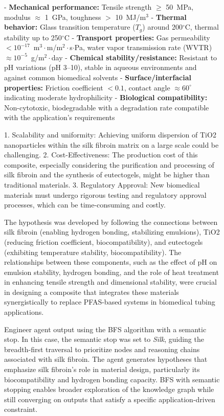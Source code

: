 \begin{figure}[htbp]
\begin{mdframed}
    \textbf{}
    
    - \textbf{Mechanical performance:} Tensile strength $\geq$ 50~MPa, modulus $\approx$ 1~GPa, toughness $>$ 10~MJ/m$^3$
    - \textbf{Thermal behavior:} Glass transition temperature ($T_g$) around 200$^\circ$C, thermal stability up to 250$^\circ$C
    - \textbf{Transport properties:} Gas permeability $< 10^{-17}$~m$^3\cdot$m/m$^2\cdot$s$\cdot$Pa, water vapor transmission rate (WVTR) $\approx 10^{-5}$~g/m$^2\cdot$day
    - \textbf{Chemical stability/resistance:} Resistant to pH variations (pH 3--10), stable in aqueous environments and against common biomedical solvents
    - \textbf{Surface/interfacial properties:} Friction coefficient $< 0.1$, contact angle $\approx 60^\circ$ indicating moderate hydrophilicity
    - \textbf{Biological compatibility:} Non-cytotoxic, biodegradable with a degradation rate compatible with the application's requirements
    
    \textbf{}
    
    1. Scalability and uniformity: Achieving uniform dispersion of TiO2 nanoparticles within the silk fibroin matrix on a large scale could be challenging. 
    2. Cost-Effectiveness: The production cost of this composite, especially considering the purification and processing of silk fibroin and the synthesis of eutectogels, might be higher than traditional materials.
    3. Regulatory Approval: New biomedical materials must undergo rigorous testing and regulatory approval processes, which can be time-consuming and costly.
    
    \textbf{}
    
    The hypothesis was developed by following the connections between silk fibroin (enabling hydrogen bonding, stabilizing emulsions), TiO2 (reducing friction coefficient, biocompatibility), and eutectogels (exhibiting temperature stability, biocompatibility). The relationships between these components, such as the effect of pH on emulsion stability, hydrogen bonding, and the role of heat treatment in enhancing tensile strength and dimensional stability, were crucial in designing a composite that integrates these materials synergistically to replace PFAS-based systems in biomedical tubing applications.
    
  \end{mdframed}
  \caption{Engineer agent output using the BFS algorithm with a semantic stop. In this case, the semantic stop was set to \textit{Silk}, guiding the breadth-first traversal to prioritize nodes and reasoning chains associated with silk fibroin. The agent generates hypotheses that emphasize silk fibroin's role in material design, particularly its biocompatibility and hydrogen bonding capacity. BFS with semantic stopping enables broader exploration of the knowledge graph while still converging on outputs that satisfy a specific application-driven constraint.}
  \label{fig:engineer_BFS_semantic}
\end{figure}

